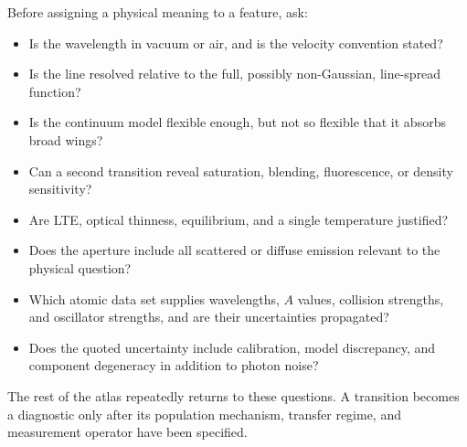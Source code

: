 Before assigning a physical meaning to a feature, ask:
\begin{itemize}
 \item Is the wavelength in vacuum or air, and is the velocity convention stated?
 \item Is the line resolved relative to the full, possibly non-Gaussian,
 line-spread function?
 \item Is the continuum model flexible enough, but not so flexible that it absorbs
 broad wings?
 \item Can a second transition reveal saturation, blending, fluorescence, or
 density sensitivity?
 \item Are LTE, optical thinness, equilibrium, and a single temperature justified?
 \item Does the aperture include all scattered or diffuse emission relevant to the
 physical question?
 \item Which atomic data set supplies wavelengths, $A$ values, collision strengths,
 and oscillator strengths, and are their uncertainties propagated?
 \item Does the quoted uncertainty include calibration, model discrepancy, and
 component degeneracy in addition to photon noise?
\end{itemize}

The rest of the atlas repeatedly returns to these questions.  A transition becomes
a diagnostic only after its population mechanism, transfer regime, and measurement
operator have been specified.
